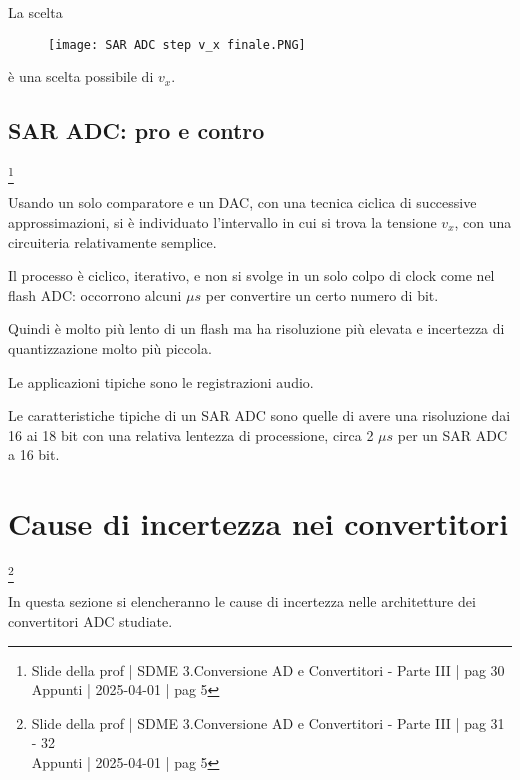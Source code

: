 La scelta 

\begin{figure}[h]
    \centering
    \texttt{[image: SAR ADC step v\_x finale.PNG]}
\end{figure}

è una scelta possibile di $v_x$. \newline 

\newpage 

\subsection{SAR ADC: pro e contro}
\footnote{Slide della prof | SDME 3.Conversione AD e Convertitori - Parte III | pag 30 \\  
Appunti | 2025-04-01 | pag 5 }

Usando un solo comparatore e un DAC, con una tecnica ciclica di successive approssimazioni, si è individuato l'intervallo in cui si trova 
la tensione $v_x$, con una circuiteria relativamente semplice. \newline 

Il processo è ciclico, iterativo, e non si svolge in un solo colpo di clock come nel flash ADC: 
occorrono alcuni $\mu s$ per convertire un certo numero di bit. \newline 

Quindi è molto più lento di un flash ma ha risoluzione più elevata e incertezza di quantizzazione molto più piccola. \newline 

Le applicazioni tipiche sono le registrazioni audio. \newline

Le caratteristiche tipiche di un SAR ADC sono quelle di avere una risoluzione dai 16 ai 18 bit con una relativa lentezza di processione, circa 2 $\mu s$ per un SAR ADC a 16 bit. \newline 

\newpage 

\section{Cause di incertezza nei convertitori}
\footnote{Slide della prof | SDME 3.Conversione AD e Convertitori - Parte III | pag 31 - 32 \\  
Appunti | 2025-04-01 | pag 5 }

In questa sezione si elencheranno le cause di incertezza nelle architetture dei convertitori ADC studiate. \newline 

